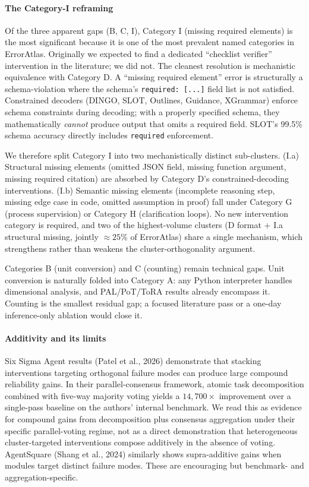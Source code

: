 \documentclass[
]{article}
\begin{document}
\paragraph{The Category-I reframing}\label{the-category-i-reframing}

Of the three apparent gaps (B, C, I), Category I (missing required
elements) is the most significant because it is one of the most
prevalent named categories in ErrorAtlas. Originally we expected to find
a dedicated ``checklist verifier'' intervention in the literature; we
did not. The cleanest resolution is mechanistic equivalence with
Category D. A ``missing required element'' error is structurally a
schema-violation where the schema's \texttt{required:\ {[}...{]}} field
list is not satisfied. Constrained decoders (DINGO, SLOT, Outlines,
Guidance, XGrammar) enforce schema constraints during decoding; with a
properly specified schema, they mathematically \emph{cannot} produce
output that omits a required field. SLOT's 99.5\% schema accuracy
directly includes \texttt{required} enforcement.

We therefore split Category I into two mechanistically distinct
sub-clusters. (I.a) Structural missing elements (omitted JSON field,
missing function argument, missing required citation) are absorbed by
Category D's constrained-decoding interventions. (I.b) Semantic missing
elements (incomplete reasoning step, missing edge case in code, omitted
assumption in proof) fall under Category G (process supervision) or
Category H (clarification loops). No new intervention category is
required, and two of the highest-volume clusters (D format + I.a
structural missing, jointly \(\approx 25\%\) of ErrorAtlas) share a
single mechanism, which strengthens rather than weakens the
cluster-orthogonality argument.

Categories B (unit conversion) and C (counting) remain technical gaps.
Unit conversion is naturally folded into Category A: any Python
interpreter handles dimensional analysis, and PAL/PoT/ToRA results
already encompass it. Counting is the smallest residual gap; a focused
literature pass or a one-day inference-only ablation would close it.

\paragraph{Additivity and its limits}\label{additivity-and-its-limits}

Six Sigma Agent results (Patel et al., 2026) demonstrate that stacking
interventions targeting orthogonal failure modes can produce large
compound reliability gains. In their parallel-consensus framework,
atomic task decomposition combined with five-way majority voting yields
a \(14{,}700\times\) improvement over a single-pass baseline on the
authors' internal benchmark. We read this as evidence for compound gains
from decomposition plus consensus aggregation under their specific
parallel-voting regime, not as a direct demonstration that heterogeneous
cluster-targeted interventions compose additively in the absence of
voting. AgentSquare (Shang et al., 2024) similarly shows supra-additive
gains when modules target distinct failure modes. These are encouraging
but benchmark- and aggregation-specific.
\end{document}
